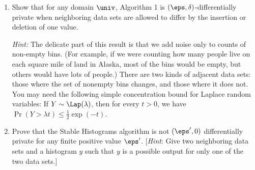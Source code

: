 \documentclass[11pt]{article}
\begin{document}
\begin{enumerate}[leftmargin=\parindent, itemsep=3ex]
  \begin{enumerate}
  \item Show that for any domain $\univ$, Algorithm 1 is
    $(\eps,\delta)$-differentially private when neighboring data sets
    are allowed to differ by the insertion or deletion of one value.

  
    \emph{Hint:} The delicate part of this result is that we add noise
    only to counts of non-empty bins. (For example, if we were
    counting how many people live on each square mile of land in
    Alaska, most of the bins would be empty, but others would have
    lots of people.) There are two kinds of adjacent data sets: those
    where the set of nonempty bins changes, and those where it does
    not.  You may need the following simple concentration bound for
    Laplace random variables: If $Y\sim\Lap(\lambda)$, then for every
    $t>0$, we have $\Pr( Y >\lambda t ) \leq \frac 1 2 \exp(-t)$.
  

    \item Prove that the Stable Histograms
    algorithm is not $(\eps',0)$ differentially private for any finite
    positive value $\eps'$. [\emph{Hint}: Give two neighboring data sets and
    a histogram $y$ such that $y$ is  a possible output for only one of
    the two data sets.]
  \end{enumerate}

\end{enumerate}
\end{document}
